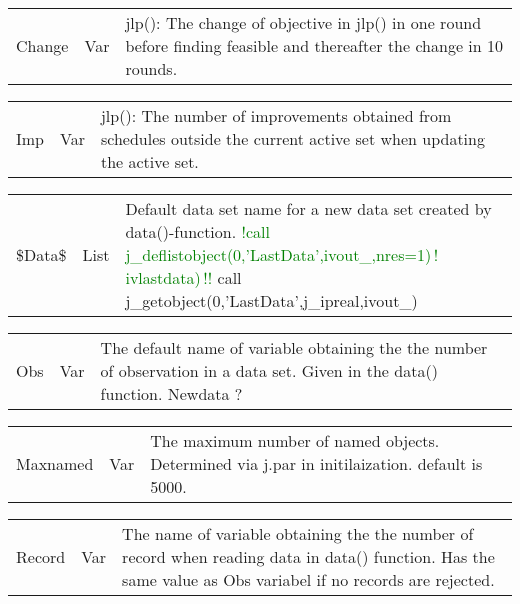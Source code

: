 \vspace{-1.51em}
\begin{table}[H]
 \begin{tabular}{ m{}  m{} p{}}
Change&Var& \textcolor{VioletRed}{jlp}(): The change of objective in \textcolor{VioletRed}{jlp}()  in one round before finding feasible and thereafter
the change in 10 rounds.
\end{tabular}
\end{table}
\vspace{-1.51em}
\begin{table}[H]
 \begin{tabular}{ m{}  m{} p{}}
Imp&Var& \textcolor{VioletRed}{jlp}(): The number of improvements obtained from schedules outside the current active
 set when updating the active set.
\end{tabular}
\end{table}
\vspace{-1.51em}
\begin{table}[H]
 \begin{tabular}{ m{}  m{} p{}}
 \$Data\$ & List& Default data set name for a new data set created by \textcolor{VioletRed}{data}()-function.
\textcolor{green}{!call\,j\_deflistobject(0,'LastData',ivout\_,nres=1)\,!\,ivlastdata)\,!!}
call j\_getobject(0,'LastData',j\_ipreal,ivout\_)
\end{tabular}
\end{table}
\vspace{-1.51em}
\begin{table}[H]
 \begin{tabular}{ m{}  m{} p{}}
 Obs& Var & The default name of variable obtaining the the number of
 observation in a data set. Given in the \textcolor{VioletRed}{data}() function. Newdata ?
\end{tabular}
\end{table}
\vspace{-1.51em}
\begin{table}[H]
 \begin{tabular}{ m{}  m{} p{}}
Maxnamed &Var& The maximum number of named objects. Determined via j.par in
 initilaization. default is 5000.
\end{tabular}
\end{table}
\vspace{-1.51em}
\begin{table}[H]
 \begin{tabular}{ m{}  m{} p{}}
 Record& Var & The name of variable obtaining the the number of
 record when reading data in \textcolor{VioletRed}{data}() function. Has the same value as Obs variabel
 if no records are rejected.
\end{tabular}
\end{table}
